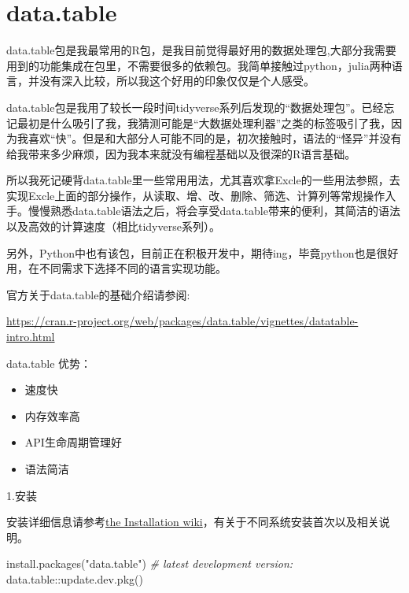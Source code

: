 \documentclass[
]{book}
\newenvironment{Shaded}{\begin{snugshade}}{\end{snugshade}}
\newcommand{\CommentTok}[1]{\textcolor[rgb]{0.56,0.35,0.01}{\textit{#1}}}
\newcommand{\FunctionTok}[1]{\textcolor[rgb]{0.00,0.00,0.00}{#1}}
\newcommand{\NormalTok}[1]{#1}
\newcommand{\SpecialCharTok}[1]{\textcolor[rgb]{0.00,0.00,0.00}{#1}}
\newcommand{\StringTok}[1]{\textcolor[rgb]{0.31,0.60,0.02}{#1}}
\providecommand{\tightlist}{%
  \setlength{\itemsep}{0pt}\setlength{\parskip}{0pt}}
\begin{document}
\hypertarget{data.table}{%
\chapter{data.table}\label{data.table}}

data.table包是我最常用的R包，是我目前觉得最好用的数据处理包,大部分我需要用到的功能集成在包里，不需要很多的依赖包。我简单接触过python，julia两种语言，并没有深入比较，所以我这个好用的印象仅仅是个人感受。

data.table包是我用了较长一段时间tidyverse系列后发现的``数据处理包''。已经忘记最初是什么吸引了我，我猜测可能是``大数据处理利器''之类的标签吸引了我，因为我喜欢``快''。但是和大部分人可能不同的是，初次接触时，语法的``怪异''并没有给我带来多少麻烦，因为我本来就没有编程基础以及很深的R语言基础。

所以我死记硬背data.table里一些常用用法，尤其喜欢拿Excle的一些用法参照，去实现Excle上面的部分操作，从读取、增、改、删除、筛选、计算列等常规操作入手。慢慢熟悉data.table语法之后，将会享受data.table带来的便利，其简洁的语法以及高效的计算速度（相比tidyverse系列）。

另外，Python中也有该包，目前正在积极开发中，期待ing，毕竟python也是很好用，在不同需求下选择不同的语言实现功能。

官方关于data.table的基础介绍请参阅:

\url{https://cran.r-project.org/web/packages/data.table/vignettes/datatable-intro.html}

data.table 优势：

\begin{itemize}
\tightlist
\item
  速度快
\item
  内存效率高
\item
  API生命周期管理好
\item
  语法简洁
\end{itemize}

1.安装

安装详细信息请参考\href{https://github.com/Rdatatable/data.table/wiki/Installation}{the Installation wiki}，有关于不同系统安装首次以及相关说明。

\begin{Shaded}
\begin{Highlighting}[]
\FunctionTok{install.packages}\NormalTok{(}\StringTok{"data.table"}\NormalTok{)}
\CommentTok{\# latest development version:}
\NormalTok{data.table}\SpecialCharTok{::}\FunctionTok{update.dev.pkg}\NormalTok{()}
\end{Highlighting}
\end{Shaded}
\end{document}
